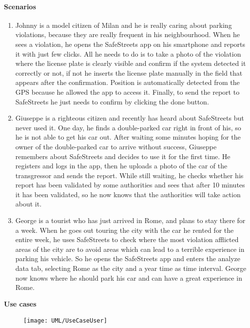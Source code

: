 \paragraph{Scenarios}
    \begin{enumerate}
        \item Johnny is a model citizen of Milan and he is really caring about parking violations, because they are really frequent in his neighbourhood. When he sees a violation, he opens the SafeStreets app on his smartphone and reports it with just few clicks. All he needs to do is to take a photo of the violation where the license plate is clearly visible and confirm if the system detected it correctly or not, if not he inserts the license plate manually in the field that appears after the confirmation. Position is automatically detected from the GPS because he allowed the app to access it. Finally, to send the report to SafeStreets he just needs to confirm by clicking the done button.
        
        \item Giuseppe is a righteous citizen and recently has heard about SafeStreets but never used it. One day, he finds a double-parked car right in front of his, so he is not able to get his car out. After waiting some minutes hoping for the owner of the double-parked car to arrive without success, Giuseppe remembers about SafeStreets and decides to use it for the first time. He registers and logs in the app, then he uploads a photo of the car of the transgressor and sends the report. While still waiting, he checks whether his report has been validated by some authorities and sees that after 10 minutes it has been validated, so he now knows that the authorities will take action about it.
        
        \item George is a tourist who has just arrived in Rome, and plans to stay there for a week. When he goes out touring the city with the car he rented for the entire week, he uses SafeStreets to check where the most violation afflicted areas of the city are to avoid areas which can lead to a terrible experience in parking his vehicle. So he opens the SafeStreets app and enters the analyze data tab, selecting Rome as the city and a year time as time interval. George now knows where he should park his car and can have a great experience in Rome.
    \end{enumerate}
\textbf{Use cases}
\begin{figure}[H]
	\centering
    \texttt{[image: UML/UseCaseUser]}
\end{figure}	




